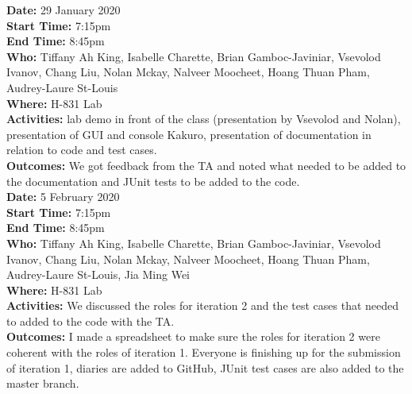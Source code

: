 \documentclass[12pt]{article}
\begin{document}
{\bf Date:} 29 January 2020 \\
{\bf Start Time:} 7:15pm\\
{\bf End Time:} 8:45pm\\
{\bf Who:} Tiffany Ah King, Isabelle Charette, Brian Gamboc-Javiniar, Vsevolod Ivanov, Chang Liu, Nolan Mckay, Nalveer Moocheet, Hoang Thuan Pham, Audrey-Laure St-Louis\\
{\bf Where:} H-831 Lab \\
{\bf Activities:} lab demo in front of the class (presentation by Vsevolod and Nolan), presentation of GUI and console Kakuro, presentation of documentation in relation to code and test cases. \\
{\bf Outcomes:} We got feedback from the TA and noted what needed to be added to the documentation and JUnit tests to be added to the code. \\

{\bf Date:} 5 February 2020 \\
{\bf Start Time:} 7:15pm\\
{\bf End Time:} 8:45pm\\
{\bf Who:} Tiffany Ah King, Isabelle Charette, Brian Gamboc-Javiniar, Vsevolod Ivanov, Chang Liu, Nolan Mckay, Nalveer Moocheet, Hoang Thuan Pham, Audrey-Laure St-Louis, Jia Ming Wei\\
{\bf Where:} H-831 Lab \\
{\bf Activities:}  We discussed the roles for iteration 2 and the test cases that needed to added to the code with the TA.\\
{\bf Outcomes:} I made a spreadsheet to make sure the roles for iteration 2 were coherent with the roles of iteration 1. Everyone is finishing up for the submission of iteration 1, diaries are added to GitHub, JUnit test cases are also added to the master branch.\\

\end{document}
